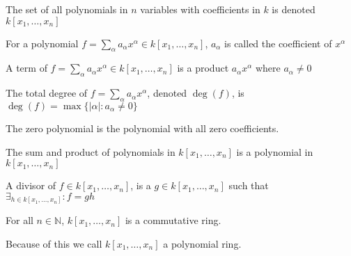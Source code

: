 \documentclass[crop=false,class=article,oneside]{standalone}
\begin{document}
            \begin{notation}
                The set of all polynomials in $n$
                variables with coefficients in $k$ is
                denoted $k[x_1,\hdots ,x_n]$
            \end{notation}
            \begin{definition}
                For a polynomial
                $f=\sum_{\alpha}%
                   a_{\alpha}x^{\alpha}%
                   \in{k}[x_1,\hdots ,x_n]$,
                $a_\alpha$ is called the
                coefficient of $x^{\alpha}$
            \end{definition}
            \begin{definition}
                A term of
                $f=\sum_{\alpha}a_{\alpha}x^{\alpha}%
                   \in k[x_1,\hdots ,x_n]$ is a product
                $a_{\alpha}x^{\alpha}$ where
                $a_{\alpha}\ne{0}$
            \end{definition}
            \begin{definition}
                The total degree of
                $f=\sum_{\alpha}a_\alpha x^\alpha$,
                denoted $\deg(f)$, is
                $\deg(f)=\max\{|\alpha|:a_\alpha\ne{0}\}$
            \end{definition}
            \begin{definition}
                The zero polynomial is the
                polynomial with all zero coefficients.
            \end{definition}
            \begin{theorem}
                The sum and product of polynomials in
                $k[x_1,\hdots ,x_n]$ is a polynomial
                in $k[x_1,\hdots,x_n]$
            \end{theorem}
            \begin{definition}
                A divisor of $f\in k[x_{1},\hdots,x_{n}]$,
                is a $g\in k[x_{1},\hdots,x_{n}]$ such that
                $\exists_{h\in k[x_{1},\hdots,x_{n}]}:f=gh$
            \end{definition}
            \begin{theorem}
                For all $n\in\mathbb{N}$,
                $k[x_1,\hdots ,x_n]$ is a commutative ring.
            \end{theorem}
            \begin{remark}
                Because of this we call
                $k[x_1,\hdots ,x_n]$ a polynomial ring.
            \end{remark}
\end{document}
